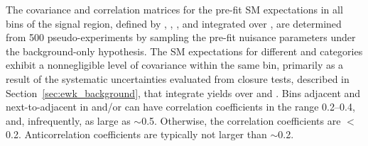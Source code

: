 The covariance and correlation matrices for the pre-fit SM
expectations in all bins of the signal region, defined by \njet, \nb,
\scalht, and integrated over \HTmiss, are determined from 500
pseudo-experiments by sampling the pre-fit nuisance parameters under
the background-only hypothesis. The SM expectations for different
\njet and \nb categories exhibit a nonnegligible level of covariance
within the same \scalht bin, primarily as a result of the systematic
uncertainties evaluated from closure tests, described in
Section~\ref{sec:ewk_background}, that integrate yields over \njet and
\nb. Bins adjacent and next-to-adjacent in \njet and/or \nb can have
correlation coefficients in the range 0.2--0.4, and, infrequently, as
large as $\sim$0.5. Otherwise, the correlation coefficients are
$<$0.2. Anticorrelation coefficients are typically not larger than
$\sim$0.2.

